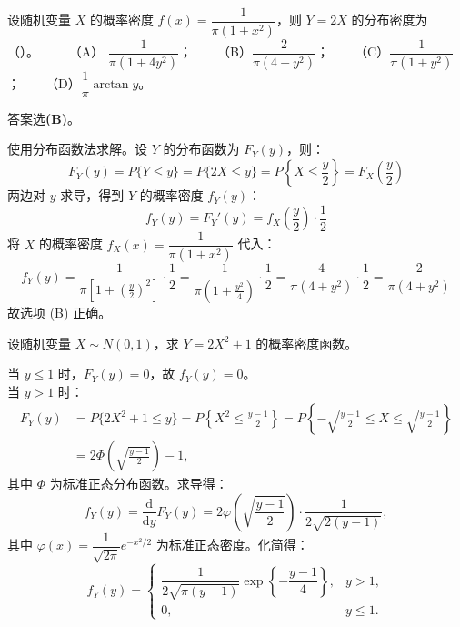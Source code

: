 ﻿\documentclass[lang=cn,11pt]{elegantbook}
\begin{document}
\begin{exercise}[柯西分布尺度变换]
设随机变量 $X$ 的概率密度 $f(x)=\dfrac{1}{\pi(1+x^2)}$，则 $Y=2X$ 的分布密度为（\quad）。~~~~
（A） $\dfrac{1}{\pi(1+4y^2)}$；~~~~（B）$\dfrac{2}{\pi(4+y^2)}$；~~~~（C）$\dfrac{1}{\pi(1+y^2)}$；~~~~（D）$\dfrac{1}{\pi}\arctan y$。
\end{exercise}
\begin{solution}
答案选\textbf{(B)}。

使用分布函数法求解。设 $Y$ 的分布函数为 $F_Y(y)$，则：
\[
F_Y(y) = P\{Y \le y\} = P\{2X \le y\} = P\left\{X \le \frac{y}{2}\right\} = F_X\left(\frac{y}{2}\right)
\]
两边对 $y$ 求导，得到 $Y$ 的概率密度 $f_Y(y)$：
\[
f_Y(y) = F_Y'(y) = f_X\left(\frac{y}{2}\right) \cdot \frac{1}{2}
\]
将 $X$ 的概率密度 $f_X(x) = \dfrac{1}{\pi(1+x^2)}$ 代入：
\[
f_Y(y) = \frac{1}{\pi\left[1+\left(\frac{y}{2}\right)^2\right]} \cdot \frac{1}{2} = \frac{1}{\pi\left(1+\frac{y^2}{4}\right)} \cdot \frac{1}{2} = \frac{4}{\pi(4+y^2)} \cdot \frac{1}{2} = \frac{2}{\pi(4+y^2)}
\]
故选项 (B) 正确。
\end{solution}

\begin{exercise}[正态分布平方变换] 
设随机变量 $X\sim N(0,1)$，求 $Y=2X^2+1$ 的概率密度函数。
\end{exercise}
\begin{solution}
当 $y\leqslant1$ 时，$F_Y(y)=0$，故 $f_Y(y)=0$。\\
当 $y>1$ 时：
\[
\begin{aligned}
F_Y(y) &= P\{2X^2+1\leqslant y\} = P\left\{X^2\leqslant\frac{y-1}{2}\right\} = P\left\{-\sqrt{\frac{y-1}{2}}\leqslant X\leqslant\sqrt{\frac{y-1}{2}}\right\} \\
&= 2\Phi\left(\sqrt{\frac{y-1}{2}}\right)-1,
\end{aligned}
\]
其中 $\Phi$ 为标准正态分布函数。求导得：
\[
f_Y(y) = \frac{\mathrm{d}}{\mathrm{d}y}F_Y(y) = 2\varphi\left(\sqrt{\frac{y-1}{2}}\right)\cdot\frac{1}{2\sqrt{2(y-1)}},
\]
其中 $\varphi(x)=\dfrac{1}{\sqrt{2\pi}}e^{-x^2/2}$ 为标准正态密度。化简得：
\[
f_Y(y) =
\begin{cases}
\dfrac{1}{2\sqrt{\pi(y-1)}}\exp\left\{-\dfrac{y-1}{4}\right\}, & y>1, \\[8pt]
0, & y\leqslant1.
\end{cases}
\]
\end{solution}
\end{document}
